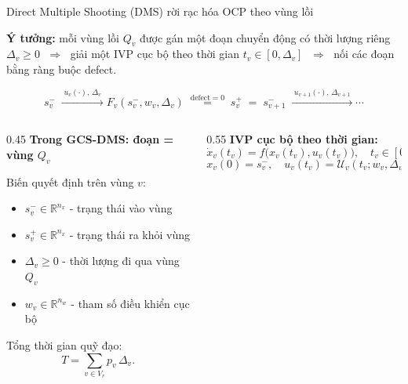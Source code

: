 \documentclass[aspectratio=169]{beamer}
\begin{document}
\begin{frame}{Direct Multiple Shooting (DMS) rời rạc hóa OCP theo vùng lồi}
    \small

    \textbf{Ý tưởng:} mỗi vùng lồi $Q_v$ được gán một đoạn chuyển động có thời lượng riêng
    $\Delta_v \ge 0$ $\;\Rightarrow\;$ giải một IVP cục bộ theo thời gian
    $t_v \in [0,\Delta_v]$ $\;\Rightarrow\;$ nối các đoạn bằng ràng buộc defect.

    \[
        s_v^-
        \;\xrightarrow{\;u_v(\cdot),\,\Delta_v\;}
        F_v(s_v^-,w_v,\Delta_v)
        \;\overset{\text{defect}=0}{=}\;
        s_v^+
        \;=\;
        s_{v+1}^-
        \;\xrightarrow{\;u_{v+1}(\cdot),\,\Delta_{v+1}\;}
        \cdots
    \]

    \vspace{0.2em}

    \begin{columns}[T, onlytextwidth]
        \begin{column}{0.45\textwidth}
            \textbf{Trong GCS-DMS: đoạn = vùng $Q_v$}

            \vspace{0.3em}
            Biến quyết định trên vùng $v$:
            \begin{itemize}
                \item $s_v^- \in \mathbb{R}^{n_x}$ - trạng thái vào vùng
                \item $s_v^+ \in \mathbb{R}^{n_x}$ - trạng thái ra khỏi vùng
                \item $\Delta_v \ge 0$ - thời lượng đi qua vùng $Q_v$
                \item $w_v \in \mathbb{R}^{n_w}$ - tham số điều khiển cục bộ
            \end{itemize}

            Tổng thời gian quỹ đạo:
            \[
                T = \sum_{v\in V_r} p_v\,\Delta_v .
            \]
        \end{column}

        \begin{column}{0.55\textwidth}
            \textbf{IVP cục bộ theo thời gian:}
            \[
                \dot{x}_v(t_v)
                =
                f\!\bigl(x_v(t_v),u_v(t_v)\bigr),
                \quad
                t_v\in[0,\Delta_v],
            \]
            \[
                x_v(0)=s_v^-,
                \quad
                u_v(t_v)=\mathcal{U}_v(t_v;w_v,\Delta_v).
            \]


\end{column}
\end{columns}
\end{frame}
\end{document}
